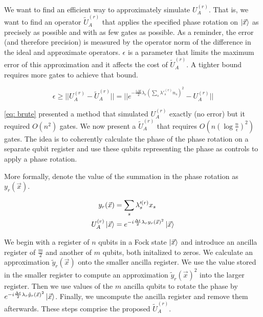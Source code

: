 We want to find an efficient way to approximately simulate $U_A^{(r)}$. That is, we want to find an operator $\tilde{U}_A^{(r)}$ that applies the specified phase rotation on $\ket{\vec{x}}$ as precisely as possible and with as few gates as possible. As a reminder, the error (and therefore precision) is measured by the operator norm of the difference in the ideal and approximate operators. $\epsilon$ is a parameter that limits the maximum error of this approximation and it affects the cost of $\tilde{U}_A^{(r)}$. A tighter bound requires more gates to achieve that bound.

\begin{equation}
    \epsilon \geq ||U_A^{(r)} - \tilde{U}_A^{(r)}|| = ||e^{-\frac{i\Delta t}{2}\lambda_r\left(\sum_s \lambda'^{(r)}_s n_s\right)^2} - U_A^{(r)}|| \label{eq: error}
\end{equation}

\eqref{eq: brute} presented a method that simulated $U_A^{(r)}$ exactly (no error) but it required $O(n^2)$ gates. We now present a $\tilde{U}_A^{(r)}$ that requires $O(n(\log{\frac{n}{\epsilon}})^2)$ gates. The idea is to coherently calculate the phase of the phase rotation on a separate qubit register and use these qubits representing the phase as controls to apply a phase rotation.

More formally, denote the value of the summation in the phase rotation as $y_r(\vec{x})$.

\begin{equation}
    \begin{split}
        y_r(\vec{x}) &= \sum_s \lambda'^{(r)}_s x_s \\
        U_A^{(r)}\ket{\vec{x}} &= e^{-i\frac{\Delta t}{2}\lambda_ry_r(\vec{x})^2}\ket{\vec{x}}
    \end{split}
\end{equation}

We begin with a register of $n$ qubits in a Fock state $\ket{\vec{x}}$ and introduce an ancilla register of $\frac{m}{2}$ and another of $m$ qubits, both initalized to zeros. We calculate an approximation $\tilde{y}_r(\vec{x})$ onto the smaller ancilla register. We use the value stored in the smaller register to compute an approximation $\tilde{y}_r(\vec{x})^2$ into the larger register. Then we use values of the $m$ ancilla qubits to rotate the phase by $e^{-i\frac{\Delta t}{2}\lambda_r\tilde{y}_r(\vec{x})^2}\ket{\vec{x}}$. Finally, we uncompute the ancilla register and remove them afterwards. These steps comprise the proposed $\tilde{U}_A^{(r)}$.


